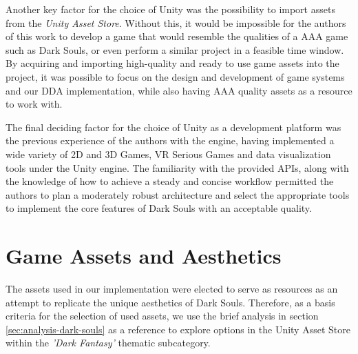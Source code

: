 
Another key factor for the choice of Unity was the possibility to import assets from the \emph{Unity Asset Store}. Without this, it would be impossible for the authors of this work to develop a game that would resemble the qualities of a AAA game such as Dark Souls, or even perform a similar project in a feasible time window. By acquiring and importing high-quality and ready to use game assets into the project, it was possible to focus on the design and development of game systems and our DDA implementation, while also having AAA quality assets as a resource to work with.

The final deciding factor for the choice of Unity as a development platform was the previous experience of the authors with the engine, having implemented a wide variety of 2D and 3D Games, VR Serious Games and data visualization tools under the Unity engine. The familiarity with the provided APIs, along with the knowledge of how to achieve a steady and concise workflow permitted the authors to plan a moderately robust architecture and select the appropriate tools to implement the core features of Dark Souls with an acceptable quality.


\section{Game Assets and Aesthetics}

The assets used in our implementation were elected to serve as resources as an attempt to replicate the unique aesthetics of Dark Souls. Therefore, as a basis criteria for the selection of used assets, we use the brief analysis in section \ref{sec:analysis-dark-souls} as a reference to explore options in the Unity Asset Store within the \emph{'Dark Fantasy'} thematic subcategory.

